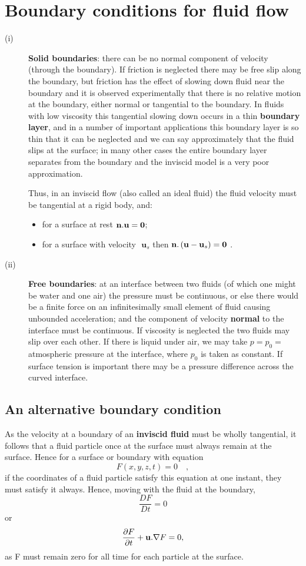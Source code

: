 \documentclass[twoside,a4paper,11pt]{report}
\begin{document}
\section{Boundary conditions for fluid flow}
\begin{description}
\item[(i)] \textbf{Solid boundaries}: there can be no normal component of velocity 
(through the boundary). If friction is neglected there may be free slip 
along the boundary, but friction has the effect of slowing down fluid near 
the boundary and it is observed experimentally that there is no relative 
motion at the boundary, either normal or tangential to the boundary. In 
fluids with low viscosity this tangential slowing down occurs in a thin 
\textbf{boundary layer}, and in a number of important applications this 
boundary layer is so thin that it can be neglected and we can say 
approximately that the fluid slips at the surface; in many other cases the 
entire boundary layer separates from the boundary and the inviscid model is 
a very poor approximation.

Thus, in an inviscid flow (also called an ideal fluid) the fluid velocity 
must be tangential at a rigid body, and: 
\begin{itemize}
\item for a surface at rest ${{\bf n}}. {{\bf u}}={\rm 
{\bf 0}}$;
\item for a surface with velocity $\textbf{ u}_{s }$ then ${{\bf n}}. 
\left( {{{\bf u}}-{{\bf u}}_s } \right)={{\bf 0}}$ .
\end{itemize}
\item[(ii)] \textbf{Free boundaries}: at an interface between two fluids (of which 
one might be water and one air) the pressure must be continuous, or else 
there would be a finite force on an infinitesimally small element of fluid 
causing unbounded acceleration; and the component of velocity 
\textbf{normal} to the interface must be continuous. If viscosity is 
neglected the two fluids may slip over each other. If there is liquid under 
air, we may take $ p = p_{0}  = $atmospheric pressure at the interface, where 
$p_{0}$ is taken as constant. If surface tension is important there may be a 
pressure difference across the curved interface. 
\end{description}

\subsection{An alternative boundary condition}
As the velocity at a boundary of an \textbf{inviscid fluid} must be wholly 
tangential, it follows that a fluid particle once at the surface must always 
remain at the surface. Hence for a surface or boundary with equation
\[
F(x,y,z,t)=0\quad ,
\]
if the coordinates of a fluid particle satisfy this equation at one instant, 
they must satisfy it always. Hence, moving with the fluid at the boundary,
\[
\frac{DF}{Dt}=0
\]
or 
\[ \frac{\partial F}{\partial t}+{{\bf u}}. \nabla 
F=0, \]
as F must remain zero for all time for each particle at the surface.
\end{document}
